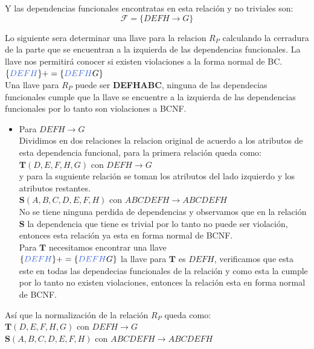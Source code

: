 \documentclass[10pt]{article}
\begin{document}
\begin{enumerate}
    	Y las dependencias funcionales encontratas en esta relación  y no triviales son:\\
    	\[\mathcal{F} = \{DEFH \rightarrow G\}\]
    	
    	Lo siguiente sera determinar una llave para la relacion $R_P$ calculando la cerradura de la parte que se encuentran a la izquierda de las dependencias funcionales. La llave nos permitirá conocer si existen violaciones a la forma normal de BC.\\
    	
    	$\{\textcolor{RoyalBlue}{DEFH}\}+= \{\textcolor{RoyalBlue}{DEFH}G\}$\\
    	
    	Una llave para $R_P$ puede ser \textbf{DEFHABC}, ninguna de las dependecias funcionales cumple que la llave se encuentre a la izquierda de las dependencias funcionales por lo tanto son violaciones a BCNF.\\
    	\begin{itemize}
    		\item Para $DEFH \rightarrow G$\\
    		Dividimos en dos relaciones la relacion original de acuerdo a los atributos de esta dependencia funcional, para la primera relación queda como:\\
    		
    		$\textbf{T}(D,E,F,H,G)$ con $DEFH \rightarrow G$\\
    		
    		y para la suguiente relación se toman los atributos del lado izquierdo y los atributos restantes.\\
    		
    		$\textbf{S}(A,B,C,D,E,F,H)$ con $ABCDEFH \rightarrow ABCDEFH$\\ 
    		
    		No se tiene ninguna perdida de dependencias y observamos que en la relación
    		$\textbf{S}$ la dependencia que tiene es trivial por lo tanto no puede ser violación, entonces esta relación ya esta en forma normal de BCNF. \\
    		Para $\textbf{T}$  necesitamos encontrar una llave\\
    		$\{\textcolor{RoyalBlue}{DEFH}\}+= \{\textcolor{RoyalBlue}{DEFH}G\}$ la llave para $\textbf{T}$ es $DEFH$, verificamos que esta este en todas las dependecias funcionales de la relación y como esta la cumple por lo tanto no existen violaciones, entonces la relación esta en forma normal de BCNF.\\
    	\end{itemize}
    	Así que la normalización de la relación $R_P$ queda como:\\
    	
    	$\textbf{T}(D,E,F,H,G)$ con $DEFH \rightarrow G$\\
    	$\textbf{S}(A,B,C,D,E,F,H)$ con $ABCDEFH \rightarrow ABCDEFH$\\ 
    	
     
    \end{enumerate}
	
\end{document}
